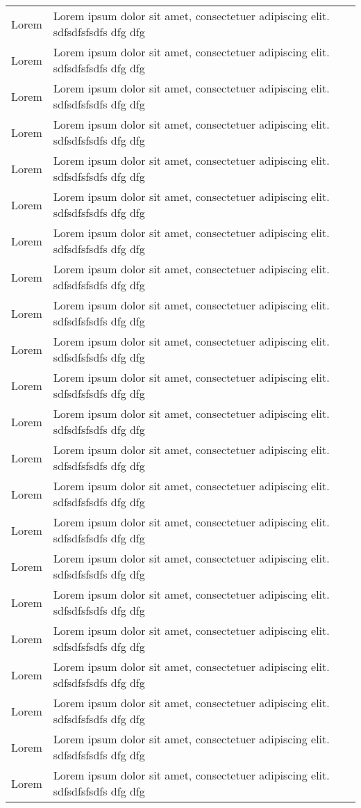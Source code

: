 \begin{longtable}{|>{\small\setlength\hsize{.5\hsize}}X|>{\small\setlength\hsize{1.5\hsize}}X|}
Lorem & Lorem ipsum dolor sit amet, consectetuer adipiscing elit. sdfsdfsfsdfs dfg dfg\\
Lorem & Lorem ipsum dolor sit amet, consectetuer adipiscing elit. sdfsdfsfsdfs dfg dfg\\
Lorem & Lorem ipsum dolor sit amet, consectetuer adipiscing elit. sdfsdfsfsdfs dfg dfg\\
Lorem & Lorem ipsum dolor sit amet, consectetuer adipiscing elit. sdfsdfsfsdfs dfg dfg\\
Lorem & Lorem ipsum dolor sit amet, consectetuer adipiscing elit. sdfsdfsfsdfs dfg dfg\\
Lorem & Lorem ipsum dolor sit amet, consectetuer adipiscing elit. sdfsdfsfsdfs dfg dfg\\
Lorem & Lorem ipsum dolor sit amet, consectetuer adipiscing elit. sdfsdfsfsdfs dfg dfg\\
Lorem & Lorem ipsum dolor sit amet, consectetuer adipiscing elit. sdfsdfsfsdfs dfg dfg\\
Lorem & Lorem ipsum dolor sit amet, consectetuer adipiscing elit. sdfsdfsfsdfs dfg dfg\\
Lorem & Lorem ipsum dolor sit amet, consectetuer adipiscing elit. sdfsdfsfsdfs dfg dfg\\
Lorem & Lorem ipsum dolor sit amet, consectetuer adipiscing elit. sdfsdfsfsdfs dfg dfg\\
Lorem & Lorem ipsum dolor sit amet, consectetuer adipiscing elit. sdfsdfsfsdfs dfg dfg\\
Lorem & Lorem ipsum dolor sit amet, consectetuer adipiscing elit. sdfsdfsfsdfs dfg dfg\\
Lorem & Lorem ipsum dolor sit amet, consectetuer adipiscing elit. sdfsdfsfsdfs dfg dfg\\
Lorem & Lorem ipsum dolor sit amet, consectetuer adipiscing elit. sdfsdfsfsdfs dfg dfg\\
Lorem & Lorem ipsum dolor sit amet, consectetuer adipiscing elit. sdfsdfsfsdfs dfg dfg\\
Lorem & Lorem ipsum dolor sit amet, consectetuer adipiscing elit. sdfsdfsfsdfs dfg dfg\\
Lorem & Lorem ipsum dolor sit amet, consectetuer adipiscing elit. sdfsdfsfsdfs dfg dfg\\
Lorem & Lorem ipsum dolor sit amet, consectetuer adipiscing elit. sdfsdfsfsdfs dfg dfg\\
Lorem & Lorem ipsum dolor sit amet, consectetuer adipiscing elit. sdfsdfsfsdfs dfg dfg\\
Lorem & Lorem ipsum dolor sit amet, consectetuer adipiscing elit. sdfsdfsfsdfs dfg dfg\\
Lorem & Lorem ipsum dolor sit amet, consectetuer adipiscing elit. sdfsdfsfsdfs dfg dfg\\
\hline
\end{longtable}
